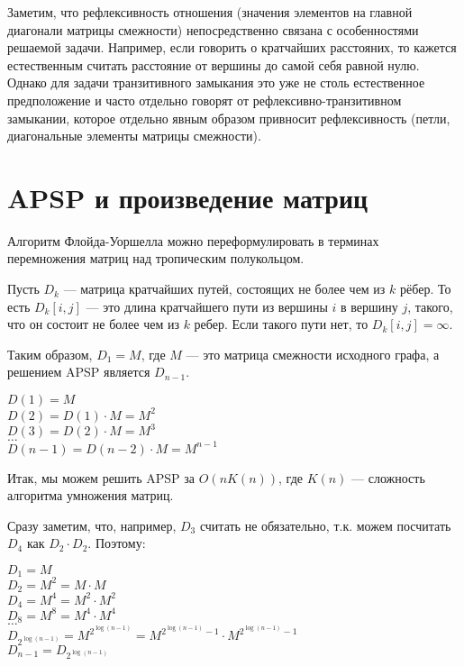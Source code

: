 Заметим, что рефлексивность отношения (значения элементов на главной диагонали матрицы смежности) непосредственно связана с особенностями решаемой задачи. Например, если говорить о кратчайших расстояних, то кажется естественным считать расстояние от вершины до самой себя равной нулю. Однако для задачи транзитивного замыкания это уже не столь естественное предположение и часто отдельно говорят от рефлексивно-транзитивном замыкании, которое отдельно явным образом привносит рефлексивность (петли, диагональные элементы матрицы смежности).



\section{APSP и произведение матриц}

Алгоритм Флойда-Уоршелла можно переформулировать в терминах перемножения матриц над тропическим полукольцом.

Пусть $D_k$ --- матрица кратчайших путей, состоящих не более чем из $k$ рёбер. То есть $D_k[i,j]$ --- это длина кратчайшего пути из вершины $i$ в вершину $j$, такого, что он состоит не более чем из $k$ ребер. Если такого пути нет, то $D_k[i,j] = \infty$.

Таким образом, $D_1 = M$, где $M$ --- это матрица смежности исходного графа, а решением APSP является $D_{n-1}$.

\begin{center}
    $D(1) = M$ \\
    $D(2) = D(1) \cdot M = M^2$ \\
    $D(3) = D(2) \cdot M = M^3$ \\
    $\dots$ \\
    $D(n-1) = D(n-2) \cdot M = M^{n-1}$ \\
\end{center}

Итак, мы можем решить APSP за $O(n K(n))$, где $K(n)$ --- сложность алгоритма умножения матриц.

Сразу заметим, что, например, $D_3$ считать не обязательно, т.к. можем посчитать $D_4$ как $D_2 \cdot D_2$.
Поэтому:

\begin{center}
    $D_1 = M$ \\
    $D_2 = M^2 = M \cdot M$ \\
    $D_4 = M^4 = M^2 \cdot M^2$ \\
    $D_8 = M^8 = M^4 \cdot M^4$ \\
    $\dots$ \\
    $D_{2^{\log(n-1)}} = M^{2^{\log(n-1)}} = M^{2^{\log(n-1)} - 1} \cdot M^{2^{\log(n-1)} - 1}$ \\
    $D_{n-1} = D_{2^{\log(n-1)}}$ \\
\end{center}

